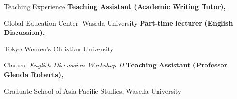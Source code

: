\begin{rubric}{Teaching Experience}
\entry*[2019/09 -- 2025/02\hfill]%
\textbf{Teaching Assistant (Academic Writing Tutor),}
\par Global Education Center, Waseda University
%
%
%
 \entry*[2023/09 -- 2024/03\hfill]%
 \textbf{Part-time lecturer (English Discussion),}
 \par Tokyo Women's Christian University
         \par Classes: \emph{English Discussion Workshop II}
\entry*[2023/04 -- 2024/03\hfill]%
\textbf{Teaching Assistant (Professor Glenda Roberts),}
\par Graduate School of Asia-Pacific Studies, Waseda University
\end{rubric}
